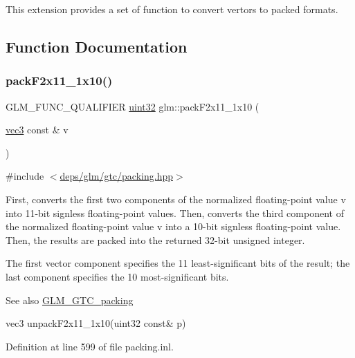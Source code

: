 This extension provides a set of function to convert vertors to packed formats. 

\subsection{Function Documentation}
\mbox{\label{group__gtc__packing_ga8c2a0eeee677ca4dafd9e093d9e81062}} 
\subsubsection{\texorpdfstring{pack\+F2x11\+\_\+1x10()}{packF2x11\_1x10()}}
{\footnotesize\ttfamily G\+L\+M\+\_\+\+F\+U\+N\+C\+\_\+\+Q\+U\+A\+L\+I\+F\+I\+ER \hyperlink{group__gtc__type__precision_ga202b6a53c105fcb7e531f9b443518451}{uint32} glm\+::pack\+F2x11\+\_\+1x10 (\begin{DoxyParamCaption}\item[{\hyperlink{group__core__types_ga1c47e8b3386109bc992b6c48e91b0be7}{vec3} const \&}]{v }\end{DoxyParamCaption})}



{\ttfamily \#include $<$\hyperlink{gtc_2packing_8hpp}{deps/glm/gtc/packing.\+hpp}$>$}

First, converts the first two components of the normalized floating-\/point value v into 11-\/bit signless floating-\/point values. Then, converts the third component of the normalized floating-\/point value v into a 10-\/bit signless floating-\/point value. Then, the results are packed into the returned 32-\/bit unsigned integer.

The first vector component specifies the 11 least-\/significant bits of the result; the last component specifies the 10 most-\/significant bits.

\begin{DoxySeeAlso}{See also}
\hyperlink{group__gtc__packing}{G\+L\+M\+\_\+\+G\+T\+C\+\_\+packing} 

vec3 unpack\+F2x11\+\_\+1x10(uint32 const\& p) 
\end{DoxySeeAlso}


Definition at line 599 of file packing.\+inl.

\mbox{\label{group__gtc__packing_ga0984f9598edc648d59a9643d9a61b121}} 
